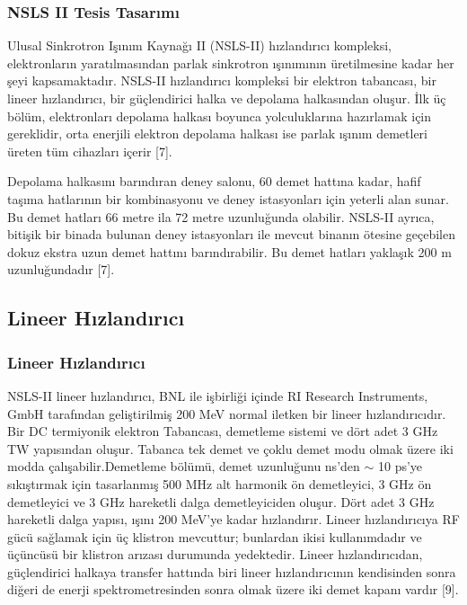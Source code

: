\documentclass[aspectratio=169,10pt]{beamer}
\begin{document}
\begin{frame}[allowframebreaks]
\frametitle{NSLS II Tesis Tasarımı}


	Ulusal Sinkrotron Işınım Kaynağı II (NSLS-II) hızlandırıcı kompleksi, elektronların yaratılmasından parlak sinkrotron ışınımının üretilmesine kadar her şeyi kapsamaktadır. NSLS-II hızlandırıcı kompleksi bir elektron tabancası, bir lineer hızlandırıcı, bir güçlendirici halka ve depolama halkasından oluşur. İlk üç bölüm, elektronları depolama halkası boyunca yolculuklarına hazırlamak için gereklidir, orta enerjili elektron depolama halkası ise parlak ışınım demetleri üreten tüm cihazları içerir [7].
	
	Depolama halkasını barındıran deney salonu, 60 demet hattına kadar, hafif taşıma hatlarının bir kombinasyonu ve deney istasyonları için yeterli alan sunar. Bu demet hatları 66 metre ila 72 metre uzunluğunda olabilir. NSLS-II ayrıca, bitişik bir binada bulunan deney istasyonları ile mevcut binanın ötesine geçebilen dokuz ekstra uzun demet hattını barındırabilir. Bu demet hatları yaklaşık 200 m uzunluğundadır [7].


\end{frame}

\subsection{Lineer Hızlandırıcı}
\begin{frame}[allowframebreaks]
\frametitle{Lineer Hızlandırıcı}


NSLS-II lineer hızlandırıcı, BNL ile işbirliği içinde RI Research Instruments, GmbH tarafından geliştirilmiş 200 MeV normal iletken bir lineer hızlandırıcıdır. Bir DC termiyonik elektron Tabancası, demetleme sistemi ve dört adet 3 GHz TW yapısından oluşur. Tabanca tek demet ve çoklu demet modu olmak üzere iki modda çalışabilir.Demetleme bölümü, demet uzunluğunu ns'den $\sim$ 10 ps'ye sıkıştırmak için tasarlanmış 500 MHz alt harmonik ön demetleyici, 3 GHz ön demetleyici ve 3 GHz hareketli dalga demetleyiciden oluşur. Dört adet 3 GHz hareketli dalga yapısı, ışını 200 MeV'ye kadar hızlandırır. Lineer hızlandırıcıya RF gücü sağlamak için üç klistron mevcuttur; bunlardan ikisi kullanımdadır ve üçüncüsü bir klistron arızası durumunda yedektedir. Lineer hızlandırıcıdan, güçlendirici halkaya transfer hattında biri lineer hızlandırıcının kendisinden sonra diğeri de enerji spektrometresinden sonra olmak üzere iki demet kapanı vardır [9].

\end{frame}
\end{document}
